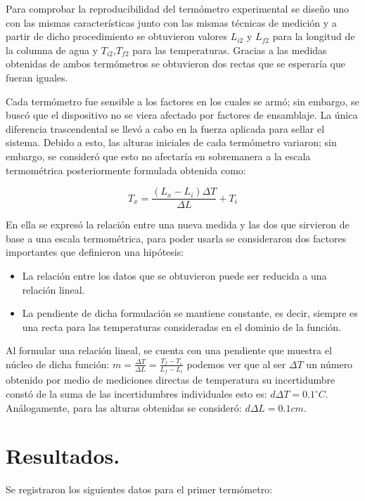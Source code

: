 \documentclass{article}
\begin{document}
Para comprobar la reproducibilidad del termómetro experimental se diseño uno con las mismas características junto con las mismas técnicas de medición y a partir de dicho procedimiento se obtuvieron valores $L_{i2}$ y $L_{f2}$ para la longitud de la columna de agua y $T_{i2}$,$T_{f2}$ para las temperaturas. Gracias a las medidas obtenidas de ambos termómetros se obtuvieron dos rectas que se esperaría que fueran iguales.

Cada termómetro fue sensible a los factores en los cuales se armó; sin embargo, se buscó que el dispositivo no se viera afectado por factores de ensamblaje. La única diferencia trascendental se llevó a cabo en la fuerza aplicada para sellar el sistema. Debido a esto, las alturas iniciales de cada termómetro variaron; sin embargo, se consideró que esto no afectaría en sobremanera a la escala termométrica posteriormente formulada obtenida como:

$$T_{x}=\frac{(L_{x}-L_{i})\Delta T}{\Delta L} + T_{i}$$

En ella se expresó la relación entre una nueva medida y las dos que sirvieron de base a una escala termométrica, para poder usarla se consideraron dos factores importantes que definieron una hipótesis:

\begin{itemize}
    \item La relación entre los datos que se obtuvieron puede ser reducida a una relación lineal.
    \item La pendiente de dicha formulación se mantiene constante, es decir, siempre es una recta para las temperaturas consideradas en el dominio de la función.
\end{itemize}

Al formular una relación lineal, se cuenta con una pendiente que muestra el núcleo de dicha función: $m = \frac{\Delta T}{\Delta L} = \frac{T_f - T_i }{L_f - L_i}$ podemos ver que al ser $\Delta T$ un número obtenido por medio de mediciones directas de temperatura su incertidumbre constó de la suma de las incertidumbres individuales esto es: $d \Delta T = 0.1^{\circ}C$. Análogamente, para las alturas obtenidas se consideró: $d \Delta L = 0.1 cm$.


\section*{Resultados.}
Se registraron los siguientes datos para el primer termómetro:
\end{document}
